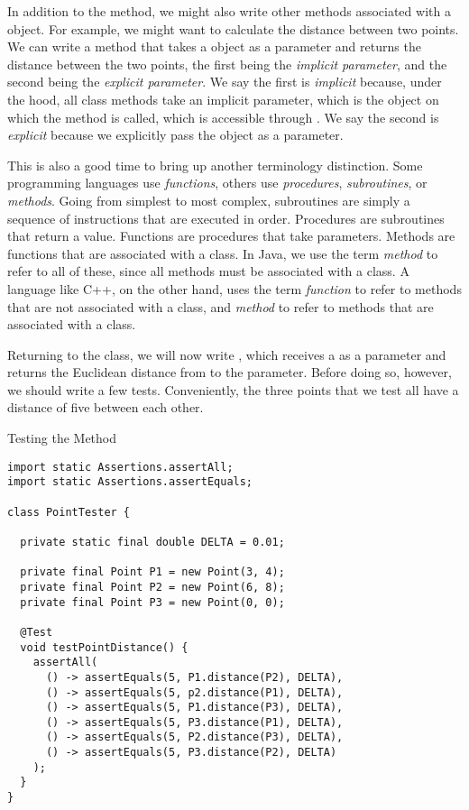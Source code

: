 In addition to the  method, we might also write other methods associated with a  object. For example, we might want to calculate the distance between two points. We can write a  method that takes a  object as a parameter and returns the distance between the two points, the first being the \textit{implicit parameter}, and the second being the \textit{explicit parameter}. We say the first is \textit{implicit} because, under the hood, all class methods take an implicit parameter, which is the object on which the method is called, which is accessible through . We say the second is \textit{explicit} because we explicitly pass the object as a parameter. 

This is also a good time to bring up another terminology distinction. Some programming languages use \textit{functions}, others use \textit{procedures}, \textit{subroutines}, or \textit{methods}. Going from simplest to most complex, subroutines are simply a sequence of instructions that are executed in order. Procedures are subroutines that return a value. Functions are procedures that take parameters. Methods are functions that are associated with a class. In Java, we use the term \textit{method} to refer to all of these, since all methods must be associated with a class. A language like C++, on the other hand, uses the term \textit{function} to refer to methods that are not associated with a class, and \textit{method} to refer to methods that are associated with a class.

Returning to the  class, we will now write , which receives a  as a parameter and returns the Euclidean distance from  to the parameter. Before doing so, however, we should write a few tests. Conveniently, the three points that we test all have a distance of five between each other.

\begin{cl}{Testing the  Method}
\begin{lstlisting}[language=MyJava]
import static Assertions.assertAll;
import static Assertions.assertEquals;

class PointTester {

  private static final double DELTA = 0.01;

  private final Point P1 = new Point(3, 4);
  private final Point P2 = new Point(6, 8);
  private final Point P3 = new Point(0, 0);

  @Test
  void testPointDistance() {
    assertAll(
      () -> assertEquals(5, P1.distance(P2), DELTA),
      () -> assertEquals(5, p2.distance(P1), DELTA),
      () -> assertEquals(5, P1.distance(P3), DELTA),
      () -> assertEquals(5, P3.distance(P1), DELTA),
      () -> assertEquals(5, P2.distance(P3), DELTA),
      () -> assertEquals(5, P3.distance(P2), DELTA)
    );
  }
}
\end{lstlisting}
\end{cl}

